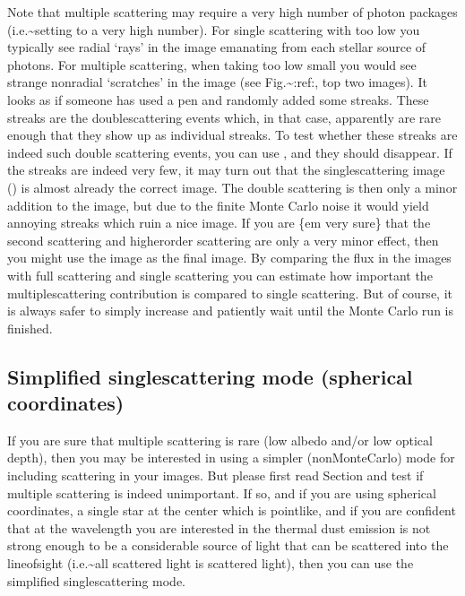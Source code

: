 \documentclass[letterpaper,10pt,english]{sphinxmanual}
\begin{document}
Note that multiple scattering may require a very high number of photon packages
(i.e.\textasciitilde{}setting  to a very high number). For single scattering with
too low  you typically see radial ‘rays’ in the image emanating
from each stellar source of photons. For multiple scattering, when taking too
low  small you would see strange non\sphinxhyphen{}radial ‘scratches’ in the
image (see Fig.\textasciitilde{}:ref:, top two images). It looks as if someone has
used a pen and randomly added some streaks. These streaks are the
double\sphinxhyphen{}scattering events which, in that case, apparently are rare enough that
they show up as individual streaks. To test whether these streaks are indeed
such double scattering events, you can use , and they should
disappear. If the streaks are indeed very few, it may turn out that the
single\sphinxhyphen{}scattering image () is almost already the correct
image. The double scattering is then only a minor addition to the image, but due
to the finite Monte Carlo noise it would yield annoying streaks which ruin a
nice image. If you are \{em very sure\} that the second scattering and
higher\sphinxhyphen{}order scattering are only a very minor effect, then you might use the
 image as the final image. By comparing the flux in the images
with full scattering and single scattering you can estimate how important the
multiple\sphinxhyphen{}scattering contribution is compared to single scattering. But of
course, it is always safer to simply increase  and patiently wait
until the Monte Carlo run is finished.


\subsection{Simplified single\sphinxhyphen{}scattering mode (spherical coordinates)}
\label{\detokenize{dustradtrans:simplified-single-scattering-mode-spherical-coordinates}}\label{\detokenize{dustradtrans:sec-simple-single-scattering}}
If you are sure that multiple scattering is rare (low albedo and/or low optical
depth), then you may be interested in using a simpler (non\sphinxhyphen{}Monte\sphinxhyphen{}Carlo) mode for
including scattering in your images.  But please first read Section
{\hyperref[\detokenize{dustradtrans:sec-single-multiple-scattering}]{}} and test if multiple scattering is indeed
unimportant. If so, and if you are using spherical coordinates, a single star at
the center which is point\sphinxhyphen{}like, and if you are confident that at the wavelength
you are interested in the thermal dust emission is not strong enough to be a
considerable source of light that can be scattered into the line\sphinxhyphen{}of\sphinxhyphen{}sight
(i.e.\textasciitilde{}all scattered light is scattered  light), then you can use the
simplified single\sphinxhyphen{}scattering mode.
\end{document}
